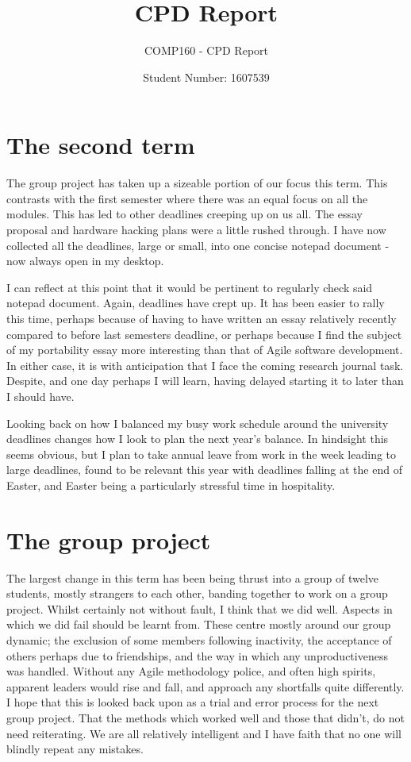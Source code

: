 \documentclass{scrartcl}
\title{CPD Report}
\subtitle{COMP160 - CPD Report}
\author{Student Number: 1607539}
\begin{document}
\maketitle

\section*{The second term}

The group project has taken up a sizeable portion of our focus this term. This contrasts with the first semester where there was an equal focus on all the modules. This has led to other deadlines creeping up on us all. The essay proposal and hardware hacking plans were a little rushed through. I have now collected all the deadlines, large or small, into one concise notepad document - now always open in my desktop.

I can reflect at this point that it would be pertinent to regularly check said notepad document. Again, deadlines have crept up. It has been easier to rally this time, perhaps because of having to have written an essay relatively recently compared to before last semesters deadline, or perhaps because I find the subject of my portability essay more interesting than that of Agile software development. In either case, it is with anticipation that I face the coming research journal task. Despite, and one day perhaps I will learn, having delayed starting it to later than I should have.

Looking back on how I balanced my busy work schedule around the university deadlines changes how I look to plan the next year's balance.  In hindsight this seems obvious, but I plan to take annual leave from work in the week leading to large deadlines, found to be relevant this year with deadlines falling at the end of Easter, and Easter being a particularly stressful time in hospitality.

\section*{The group project}

The largest change in this term has been being thrust into a group of twelve students, mostly strangers to each other, banding together to work on a group project.  Whilst certainly not without fault, I think that we did well.  Aspects in which we did fail should be learnt from.  These centre mostly around our group dynamic; the exclusion of some members following inactivity, the acceptance of others perhaps due to friendships, and the way in which any unproductiveness was  handled.  Without any Agile methodology police, and often high spirits, apparent leaders would rise and fall, and approach any shortfalls quite differently.  I hope that this is looked back upon as a trial and error process for the next group project.  That the methods which worked well and those that didn't, do not need reiterating. We are all relatively intelligent and I have faith that no one will blindly repeat any mistakes.
\end{document}
